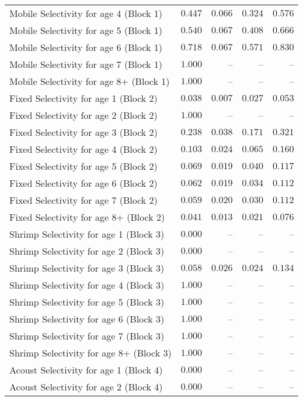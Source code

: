 \documentclass[
]{article}
\begin{document}
\begin{landscape}
\begin{longtable}[t]{lrrrr}
Mobile Selectivity for age 4 (Block 1) & $0.447$ & $0.066$ & $0.324$ & $0.576$\\
Mobile Selectivity for age 5 (Block 1) & $0.540$ & $0.067$ & $0.408$ & $0.666$\\
\addlinespace
Mobile Selectivity for age 6 (Block 1) & $0.718$ & $0.067$ & $0.571$ & $0.830$\\
Mobile Selectivity for age 7 (Block 1) & $1.000$ & -- & -- & --\\
Mobile Selectivity for age 8+ (Block 1) & $1.000$ & -- & -- & --\\
Fixed Selectivity for age 1 (Block 2) & $0.038$ & $0.007$ & $0.027$ & $0.053$\\
Fixed Selectivity for age 2 (Block 2) & $1.000$ & -- & -- & --\\
\addlinespace
Fixed Selectivity for age 3 (Block 2) & $0.238$ & $0.038$ & $0.171$ & $0.321$\\
Fixed Selectivity for age 4 (Block 2) & $0.103$ & $0.024$ & $0.065$ & $0.160$\\
Fixed Selectivity for age 5 (Block 2) & $0.069$ & $0.019$ & $0.040$ & $0.117$\\
Fixed Selectivity for age 6 (Block 2) & $0.062$ & $0.019$ & $0.034$ & $0.112$\\
Fixed Selectivity for age 7 (Block 2) & $0.059$ & $0.020$ & $0.030$ & $0.112$\\
\addlinespace
Fixed Selectivity for age 8+ (Block 2) & $0.041$ & $0.013$ & $0.021$ & $0.076$\\
Shrimp Selectivity for age 1 (Block 3) & $0.000$ & -- & -- & --\\
Shrimp Selectivity for age 2 (Block 3) & $0.000$ & -- & -- & --\\
Shrimp Selectivity for age 3 (Block 3) & $0.058$ & $0.026$ & $0.024$ & $0.134$\\
Shrimp Selectivity for age 4 (Block 3) & $1.000$ & -- & -- & --\\
\addlinespace
Shrimp Selectivity for age 5 (Block 3) & $1.000$ & -- & -- & --\\
Shrimp Selectivity for age 6 (Block 3) & $1.000$ & -- & -- & --\\
Shrimp Selectivity for age 7 (Block 3) & $1.000$ & -- & -- & --\\
Shrimp Selectivity for age 8+ (Block 3) & $1.000$ & -- & -- & --\\
Acoust Selectivity for age 1 (Block 4) & $0.000$ & -- & -- & --\\
\addlinespace
Acoust Selectivity for age 2 (Block 4) & $0.000$ & -- & -- & --\\

\end{longtable}
\end{landscape}
\end{document}
